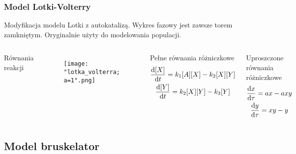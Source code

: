 \documentclass{beamer}
\begin{document}
\begin{frame}
\frametitle{Model Lotki-Volterry}
\small Modyfikacja modelu Lotki z autokatalizą. Wykres fazowy jest zawsze torem zamkniętym. Oryginalnie użyty do modelowania populacji. \normalsize
\begin{columns}
\begin{block}{Równania reakcji}
\begin{center}
	 \\
	 \\
\end{center}
\end{block}
\begin{figure}
\texttt{[image: "lotka\_volterra; a=1".png]}
\end{figure}
\begin{block}{Pełne równania różniczkowe}
\begin{gather*}
	\dv{[X]}{t}=k_{1}[A][X]-k_{2}[X][Y] \\
	\dv{[Y]}{t}=k_{2}[X][Y]-k_{3}[Y]
\end{gather*}
\end{block}
\begin{block}{Uproszczone równania różniczkowe}
\begin{gather*}
	\dv{x}{\tau} = ax-axy \\
	\dv{y}{\tau} = xy-y
\end{gather*}
\end{block}
\end{columns}
\end{frame}

\subsection{Model bruskelator}
\end{document}
